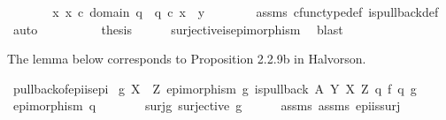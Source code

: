 \begin{isabellebody}
\ \ \ \ \isamarkupfalse%
\ \isamarkupfalse%
\ {\isachardoublequoteopen}{\isasymexists}x{\isachardot}{\kern0pt}\ x\ {\isasymin}\isactrlsub c\ domain\ q{}\ {\isasymand}\ q{}\ {\isasymcirc}\isactrlsub c\ x\ {\isacharequal}{\kern0pt}\ y{\isachardoublequoteclose}\isanewline
\ \ \ \ \ \ \isamarkupfalse%
\ assms{\isacharparenleft}{\kern0pt}{}{\isacharparenright}{\kern0pt}\ cfunc{\isacharunderscore}{\kern0pt}type{\isacharunderscore}{\kern0pt}def\ is{\isacharunderscore}{\kern0pt}pullback{\isacharunderscore}{\kern0pt}def\ \ \isamarkupfalse%
\ auto\isanewline
\ \ \isamarkupfalse%
\ \isanewline
\ \ \isamarkupfalse%
\ \isamarkupfalse%
\ {\isacharquery}{\kern0pt}thesis\isanewline
\ \ \ \ \isamarkupfalse%
\ surjective{\isacharunderscore}{\kern0pt}is{\isacharunderscore}{\kern0pt}epimorphism\ \isamarkupfalse%
\ blast\isanewline
{}\isamarkupfalse%
%
\endisatagproof
{\isafoldproof}%
%
\isadelimproof
%
\endisadelimproof
%
\begin{isamarkuptext}%
The lemma below corresponds to Proposition 2.2.9b in Halvorson.%
\end{isamarkuptext}\isamarkuptrue%
\isamarkupfalse%
\ pullback{\isacharunderscore}{\kern0pt}of{\isacharunderscore}{\kern0pt}epi{\isacharunderscore}{\kern0pt}is{\isacharunderscore}{\kern0pt}epi{}{\isacharcolon}{\kern0pt}\isanewline
{}\ {\isachardoublequoteopen}g{\isacharcolon}{\kern0pt}\ X\ {\isasymrightarrow}\ Z{\isachardoublequoteclose}\ {\isachardoublequoteopen}epimorphism\ g{\isachardoublequoteclose}\ {\isachardoublequoteopen}is{\isacharunderscore}{\kern0pt}pullback\ A\ Y\ X\ Z\ q{}\ f\ q{}\ g{\isachardoublequoteclose}\isanewline
{}\ {\isachardoublequoteopen}epimorphism\ q{}{\isachardoublequoteclose}\ \isanewline
%
\isadelimproof
%
\endisadelimproof
%
\isatagproof
{}\isamarkupfalse%
\ {\isacharminus}{\kern0pt}\ \isanewline
\ \ \isamarkupfalse%
\ surj{\isacharunderscore}{\kern0pt}g{\isacharcolon}{\kern0pt}\ {\isachardoublequoteopen}surjective\ g{\isachardoublequoteclose}\isanewline
\ \ \ \ \isamarkupfalse%
\ assms{\isacharparenleft}{\kern0pt}{}{\isacharparenright}{\kern0pt}\ assms{\isacharparenleft}{\kern0pt}{}{\isacharparenright}{\kern0pt}\ epi{\isacharunderscore}{\kern0pt}is{\isacharunderscore}{\kern0pt}surj\ \isamarkupfalse%

\end{isabellebody}
